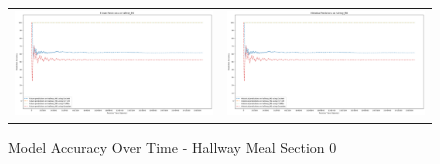 \begin{figure}
  \begin{tabular}{cc}
    {\includegraphics[width = 3in]{images/results/Future_Predictions_on_hallway_M0.png}} &
    {\includegraphics[width = 3in]{images/results/Historical_Predictions_on_hallway_M0.png}} \\
  \end{tabular}
  \caption{Model Accuracy Over Time - Hallway Meal Section 0}
\end{figure}



